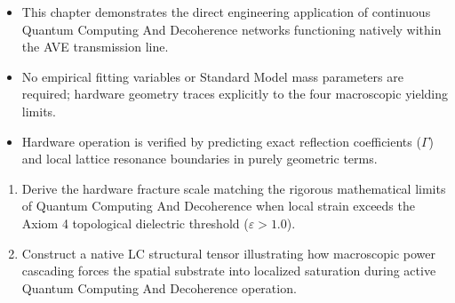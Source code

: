 \begin{summarybox}
\begin{itemize}
    \item This chapter demonstrates the direct engineering application of continuous Quantum Computing And Decoherence networks functioning natively within the AVE transmission line.
    \item No empirical fitting variables or Standard Model mass parameters are required; hardware geometry traces explicitly to the four macroscopic yielding limits.
    \item Hardware operation is verified by predicting exact reflection coefficients ($\Gamma$) and local lattice resonance boundaries in purely geometric terms.
\end{itemize}
\end{summarybox}

\begin{exercisebox}
\begin{enumerate}
    \item Derive the hardware fracture scale matching the rigorous mathematical limits of Quantum Computing And Decoherence when local strain exceeds the Axiom 4 topological dielectric threshold ($\varepsilon > 1.0$).
    \item Construct a native LC structural tensor illustrating how macroscopic power cascading forces the spatial substrate into localized saturation during active Quantum Computing And Decoherence operation.
\end{enumerate}
\end{exercisebox}
